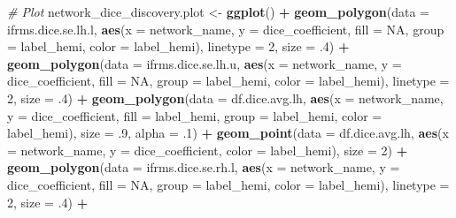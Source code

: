 \documentclass[
]{article}
\newenvironment{Shaded}{\begin{snugshade}}{\end{snugshade}}
\newcommand{\CommentTok}[1]{\textcolor[rgb]{0.56,0.35,0.01}{\textit{#1}}}
\newcommand{\DataTypeTok}[1]{\textcolor[rgb]{0.13,0.29,0.53}{#1}}
\newcommand{\DecValTok}[1]{\textcolor[rgb]{0.00,0.00,0.81}{#1}}
\newcommand{\FloatTok}[1]{\textcolor[rgb]{0.00,0.00,0.81}{#1}}
\newcommand{\KeywordTok}[1]{\textcolor[rgb]{0.13,0.29,0.53}{\textbf{#1}}}
\newcommand{\NormalTok}[1]{#1}
\newcommand{\OperatorTok}[1]{\textcolor[rgb]{0.81,0.36,0.00}{\textbf{#1}}}
\newcommand{\OtherTok}[1]{\textcolor[rgb]{0.56,0.35,0.01}{#1}}
\newcommand{\StringTok}[1]{\textcolor[rgb]{0.31,0.60,0.02}{#1}}
\begin{document}
\begin{Shaded}
\begin{Highlighting}[]
{{{{{{{{{{{{\CommentTok{# Plot}
\NormalTok{network_dice_discovery.plot <-}\StringTok{ }\KeywordTok{ggplot}\NormalTok{() }\OperatorTok{+}\StringTok{  }
\StringTok{  }\KeywordTok{geom_polygon}\NormalTok{(}\DataTypeTok{data =}\NormalTok{ ifrms.dice.se.lh.l, }
               \KeywordTok{aes}\NormalTok{(}\DataTypeTok{x =}\NormalTok{ network_name, }\DataTypeTok{y =}\NormalTok{ dice_coefficient, }\DataTypeTok{fill =} \OtherTok{NA}\NormalTok{, }\DataTypeTok{group =}\NormalTok{ label_hemi, }\DataTypeTok{color =}\NormalTok{ label_hemi), }
               \DataTypeTok{linetype =} \DecValTok{2}\NormalTok{, }\DataTypeTok{size =} \FloatTok{.4}\NormalTok{) }\OperatorTok{+}\StringTok{ }
\StringTok{  }\KeywordTok{geom_polygon}\NormalTok{(}\DataTypeTok{data =}\NormalTok{ ifrms.dice.se.lh.u, }
               \KeywordTok{aes}\NormalTok{(}\DataTypeTok{x =}\NormalTok{ network_name, }\DataTypeTok{y =}\NormalTok{ dice_coefficient, }\DataTypeTok{fill =} \OtherTok{NA}\NormalTok{, }\DataTypeTok{group =}\NormalTok{ label_hemi, }\DataTypeTok{color =}\NormalTok{ label_hemi), }
               \DataTypeTok{linetype =} \DecValTok{2}\NormalTok{, }\DataTypeTok{size =} \FloatTok{.4}\NormalTok{) }\OperatorTok{+}
\StringTok{  }\KeywordTok{geom_polygon}\NormalTok{(}\DataTypeTok{data =}\NormalTok{ df.dice.avg.lh, }
               \KeywordTok{aes}\NormalTok{(}\DataTypeTok{x =}\NormalTok{ network_name, }\DataTypeTok{y =}\NormalTok{ dice_coefficient, }
                   \DataTypeTok{fill =}\NormalTok{ label_hemi, }\DataTypeTok{group =}\NormalTok{ label_hemi, }\DataTypeTok{color =}\NormalTok{ label_hemi), }
               \DataTypeTok{size =} \FloatTok{.9}\NormalTok{, }\DataTypeTok{alpha =} \FloatTok{.1}\NormalTok{) }\OperatorTok{+}
\StringTok{  }\KeywordTok{geom_point}\NormalTok{(}\DataTypeTok{data =}\NormalTok{ df.dice.avg.lh, }
             \KeywordTok{aes}\NormalTok{(}\DataTypeTok{x =}\NormalTok{ network_name, }\DataTypeTok{y =}\NormalTok{ dice_coefficient, }\DataTypeTok{color =}\NormalTok{ label_hemi), }
             \DataTypeTok{size =} \DecValTok{2}\NormalTok{) }\OperatorTok{+}\StringTok{ }
\StringTok{  }
\StringTok{  }
\StringTok{  }\KeywordTok{geom_polygon}\NormalTok{(}\DataTypeTok{data =}\NormalTok{ ifrms.dice.se.rh.l, }
               \KeywordTok{aes}\NormalTok{(}\DataTypeTok{x =}\NormalTok{ network_name, }\DataTypeTok{y =}\NormalTok{ dice_coefficient, }\DataTypeTok{fill =} \OtherTok{NA}\NormalTok{, }\DataTypeTok{group =}\NormalTok{ label_hemi, }\DataTypeTok{color =}\NormalTok{ label_hemi), }
               \DataTypeTok{linetype =} \DecValTok{2}\NormalTok{, }\DataTypeTok{size =} \FloatTok{.4}\NormalTok{) }\OperatorTok{+}\StringTok{ }
}}}}}}}}}}}}
\end{Highlighting}
\end{Shaded}
\end{document}
